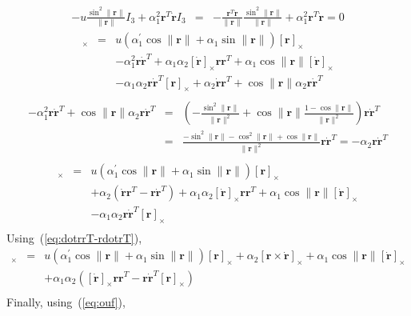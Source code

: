 \documentclass {article}
\newcommand\rot{\mathbf{r}}
\newcommand\rcross{[\rot]_{\times}}
\newcommand\omegacross{[\omega]_{\times}}
\newcommand\rdotcross{\left[\dot{\rot}\right]_{\times}}
\newcommand\normr{\|\rot\|}
\newcommand\alphap{\alpha^{\prime}}
\begin{document}
\begin{eqnarray*}
-u \frac{\sin^2\normr}{\normr} I_3 + \alpha_1^2\rot^T\dot{\rot} I_3 &=&
-\frac{\rot^T\dot{\rot}}{\normr}\frac{\sin^2\normr}{\normr}+ \alpha_1^2\rot^T\dot{\rot} = 0
\end{eqnarray*}
\begin{eqnarray*}
\omegacross &=&
u\left(\alphap_1 \cos\normr + \alpha_1\sin\normr\right) \rcross\\
&& -\alpha_1^2\rot\dot{\rot}^T+ \alpha_1 \alpha_2 \rdotcross\rot\rot^T + \alpha_1\cos\normr\rdotcross\\
&&- \alpha_1 \alpha_2 \rot\dot{\rot}^T\rcross + \alpha_2\dot{\rot}\rot^T + \cos\normr\alpha_2\rot\dot{\rot}^T\\
\end{eqnarray*}
\begin{eqnarray*}
-\alpha_1^2\rot\dot{\rot}^T+ \cos\normr\alpha_2\rot\dot{\rot}^T &=&
\left(-\frac{\sin^2\normr}{\normr^2}+\cos\normr\frac{1-\cos\normr}{\normr^2}\right)\rot\dot{\rot}^T\\
&=&\frac{-\sin^2\normr-\cos^2\normr+\cos\normr}{\normr^2}\rot\dot{\rot}^T
=-\alpha_2\rot\dot{\rot}^T\\
\end{eqnarray*}
\begin{eqnarray*}
\omegacross &=&
u\left(\alphap_1 \cos\normr + \alpha_1\sin\normr\right) \rcross\\
&& + \alpha_2\left(\dot{\rot}\rot^T -\rot\dot{\rot}^T\right)+ \alpha_1 \alpha_2 \rdotcross\rot\rot^T + \alpha_1\cos\normr\rdotcross\\
&&- \alpha_1 \alpha_2 \rot\dot{\rot}^T\rcross\\
\end{eqnarray*}
Using~(\ref{eq:dotrrT-rdotrT}),
\begin{eqnarray*}
\omegacross &=&
u\left(\alphap_1 \cos\normr + \alpha_1\sin\normr\right) \rcross + \alpha_2\left[\rot\times\dot{\rot}\right]_{\times} + \alpha_1\cos\normr\rdotcross\\
&& + \alpha_1 \alpha_2 \left(\rdotcross\rot\rot^T - \rot\dot{\rot}^T\rcross\right)\\
\end{eqnarray*}
Finally, using~(\ref{eq:ouf}),
\end{document}
